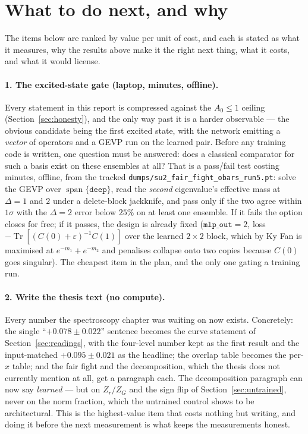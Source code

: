 \documentclass[11pt,a4paper]{article}
\newcommand{\Tr}{\operatorname{Tr}}
\newcommand{\Azero}{A_0}
\newcommand{\spn}{\operatorname{span}}
\newcommand{\arm}[1]{\texttt{#1}}
\begin{document}
\section{What to do next, and why}
\label{sec:next}

The items below are ranked by value per unit of cost, and each is stated as what
it measures, why the results above make it the right next thing, what it costs,
and what it would license.

\paragraph{1. The excited-state gate (laptop, minutes, offline).} Every
statement in this report is compressed against the $\Azero \le 1$ ceiling
(Section~\ref{sec:honesty}), and the only way past it is a harder observable ---
the obvious candidate being the first excited state, with the network emitting a
\emph{vector} of operators and a GEVP run on the learned pair. Before any
training code is written, one question must be answered: does a classical
comparator for such a basis exist on these ensembles at all? That is a pass/fail
test costing minutes, offline, from the tracked
\texttt{dumps/su2\_fair\_fight\_obars\_run5.pt}: solve the GEVP over
$\spn\{\arm{deep}\}$, read the \emph{second} eigenvalue's effective mass at
$\Delta = 1$ and $2$ under a delete-block jackknife, and pass only if the two
agree within $1\sigma$ with the $\Delta=2$ error below $25\%$ on at least one
ensemble. If it fails the option closes for free; if it passes, the design is
already fixed ($\texttt{mlp\_out} = 2$, loss $-\Tr[(C(0)+\varepsilon)^{-1}C(1)]$
over the learned $2\times2$ block, which by Ky Fan is maximised at
$e^{-m_1}+e^{-m_2}$ and penalises collapse onto two copies because $C(0)$ goes
singular). The cheapest item in the plan, and the only one gating a training
run.

\paragraph{2. Write the thesis text (no compute).} Every number the
spectroscopy chapter was waiting on now exists. Concretely: the single
``$+0.078 \pm 0.022$'' sentence becomes the curve statement of
Section~\ref{sec:readings}, with the four-level number kept as the first result
and the input-matched $+0.095 \pm 0.021$ as the headline; the overlap table
becomes the per-$x$ table; and the fair fight and the decomposition, which the
thesis does not currently mention at all, get a paragraph each. The
decomposition paragraph can now say \emph{learned} --- but on $Z_r/Z_G$ and the
sign flip of Section~\ref{sec:untrained}, never on the norm fraction, which the
untrained control shows to be architectural. This is the highest-value item that
costs nothing but writing, and doing it before the next measurement is what
keeps the measurements honest.
\end{document}
